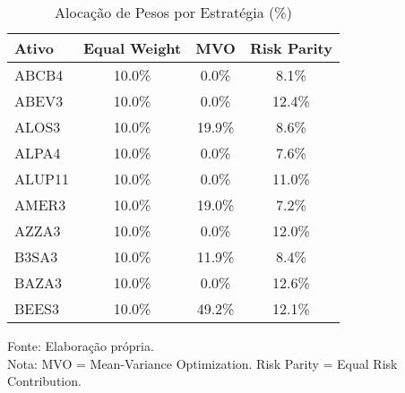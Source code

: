 \begin{table}[htbp]
\centering
\caption{Alocação de Pesos por Estratégia (\%)}
\label{tab:pesos_portfolios}
\begin{tabular}{|l|c|c|c|}
\hline
\textbf{Ativo} & \textbf{Equal Weight} & \textbf{MVO} & \textbf{Risk Parity} \\
\hline
ABCB4 & 10.0\% & 0.0\% & 8.1\% \\
ABEV3 & 10.0\% & 0.0\% & 12.4\% \\
ALOS3 & 10.0\% & 19.9\% & 8.6\% \\
ALPA4 & 10.0\% & 0.0\% & 7.6\% \\
ALUP11 & 10.0\% & 0.0\% & 11.0\% \\
AMER3 & 10.0\% & 19.0\% & 7.2\% \\
AZZA3 & 10.0\% & 0.0\% & 12.0\% \\
B3SA3 & 10.0\% & 11.9\% & 8.4\% \\
BAZA3 & 10.0\% & 0.0\% & 12.6\% \\
BEES3 & 10.0\% & 49.2\% & 12.1\% \\
\hline
\end{tabular}
\footnotesize
Fonte: Elaboração própria.\\
Nota: MVO = Mean-Variance Optimization. Risk Parity = Equal Risk Contribution.
\end{table}
